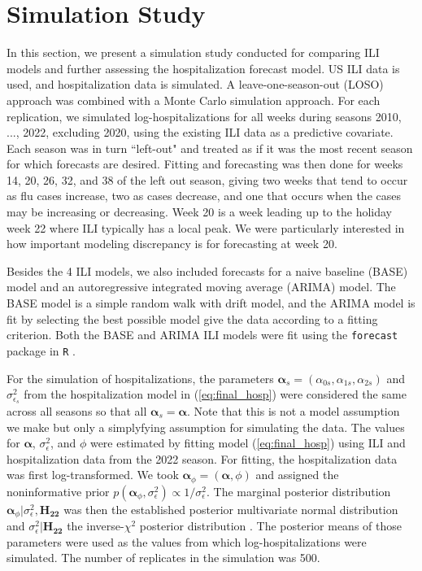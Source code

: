 \section{Simulation Study} \label{sec:simulation2}
In this section, we present a simulation study conducted for comparing ILI 
models and further assessing the hospitalization forecast model. US ILI data 
is used, and hospitalization data is simulated. 
A leave-one-season-out (LOSO) approach was combined with a Monte Carlo 
simulation approach. For each replication, we simulated log-hospitalizations 
for all weeks during seasons 2010, ..., 2022, excluding 2020, using the 
existing ILI data as a predictive covariate. Each season was in turn 
``left-out" and treated as if it was the most recent season for which forecasts
are desired. Fitting and forecasting was then done for weeks 14, 20, 26, 32, 
and 38 of the left out season, giving two weeks that tend to occur as flu 
cases increase, two as cases decrease, and one that occurs when the cases may 
be increasing or decreasing. Week 20 is a week leading up to the holiday week 
22 where ILI typically has a local peak. We were particularly interested in 
how important modeling discrepancy is for forecasting at week 20.


Besides the 4 ILI models, we also included forecasts for a naive baseline
(BASE) model and an autoregressive integrated moving average (ARIMA) model. 
The BASE model is a simple random walk with drift model, and the ARIMA model
is fit by selecting the best possible model give the data according to a 
fitting criterion. Both the BASE and ARIMA ILI models were fit using the 
\texttt{forecast} package in \texttt{R} \cite{hyndman2008forecast}.



For the simulation of hospitalizations, the parameters 
$\boldsymbol{\alpha}_s = (\alpha_{0s}, \alpha_{1s}, \alpha_{2s})$ and 
$\sigma^2_{\epsilon_s}$ from the hospitalization model in 
(\ref{eq:final_hosp}) were considered the same across all seasons so that 
all $\boldsymbol{\alpha}_s = \boldsymbol{\alpha}$. Note that this is not
a model assumption we make but only a simplyfying assumption for simulating
the data.
The values for $\boldsymbol{\alpha}$, $\sigma^2_{\epsilon}$, and $\phi$ were 
estimated by fitting model (\ref{eq:final_hosp}) using ILI and hospitalization 
data from the 2022 season. For fitting, the hospitalization data was first 
log-transformed. We took $\boldsymbol{\alpha}_{\phi} = (\boldsymbol{\alpha}, \phi)$
and assigned the noninformative prior 
$p(\boldsymbol{\alpha}_{\phi}, \sigma^2_{\epsilon}) \propto 1/\sigma^2_{\epsilon}$. 
The marginal posterior distribution 
$\boldsymbol{\alpha}_{\phi} | \sigma^2_{\epsilon}, \boldsymbol{H_{22}}$ 
was then the established posterior multivariate normal distribution and 
$\sigma^2_{\epsilon} | \boldsymbol{H_{22}}$ the inverse-$\chi^2$ posterior 
distribution \cite[]{gelman2013bayesian}. The posterior means of those 
parameters were used as the values from which log-hospitalizations were 
simulated. The number of replicates in the simulation was 500.


